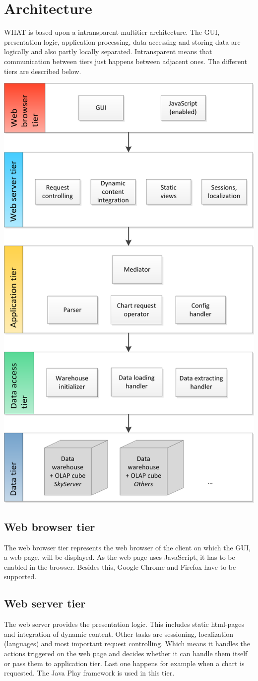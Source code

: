 \section{Architecture}

WHAT is based upon a intransparent multitier architecture. 
The GUI, presentation logic, application processing, data accessing and storing data
are logically and also partly locally separated. Intransparent means that communication
between tiers just happens between adjacent ones. The different tiers are described below.


\begin{center}
\includegraphics[width=0.6\linewidth]{Pictures/TierArchi.png} 
\end{center}   


\subsection{Web browser tier}
The web browser tier represents the web browser of the client on which the GUI, a web page, will be displayed.
As the web page uses JavaScript, it has to be enabled in the browser. 
Besides this, Google Chrome and Firefox have to be supported. 


\subsection{Web server tier}
The web server provides the presentation logic. This includes static html-pages and integration of dynamic
content. Other tasks are sessioning, localization (languages) and most important request controlling. 
Which means it handles the actions triggered on the web page and decides whether it can handle them itself 
or pass them to application tier. Last one happens for example when a chart is requested. 
The Java Play framework is used in this tier.



